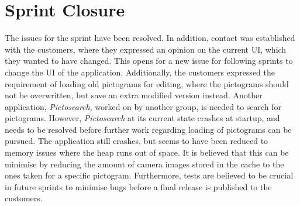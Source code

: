 \section{Sprint Closure}
The issues for the sprint have been resolved.
In addition, contact was established with the customers, where they expressed an opinion on the current UI, which they wanted to have changed.
This opens for a new issue for following sprints to change the UI of the application.
Additionally, the customers expressed the requirement of loading old pictograms for editing, where the pictograms should not be overwritten, but save an extra modified version instead.
Another application, \textit{Pictosearch}, worked on by another group, is needed to search for pictograms.
However, \textit{Pictosearch} at its current state crashes at startup, and needs to be resolved before further work regarding loading of pictograms can be pursued.
The application still crashes, but seems to have been reduced to memory issues where the heap runs out of space.
It is believed that this can be minimise by reducing the amount of camera images stored in the cache to the ones taken for a specific pictogram.
Furthermore, tests are believed to be crucial in future sprints to minimise bugs before a final release is published to the customers.